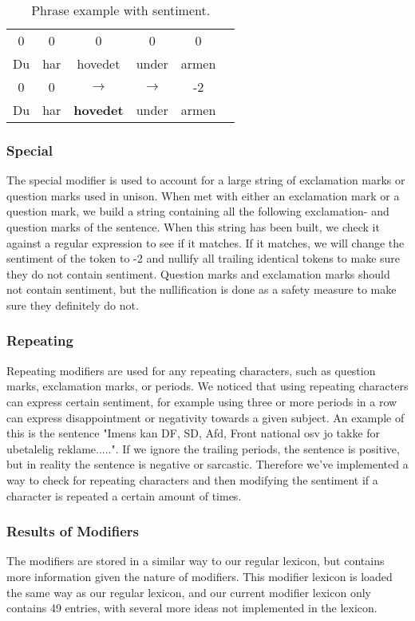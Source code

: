 \begin{table}[H]
	\begin{tabular}{cccccc} 
		0 & 0 & 0 & 0 & 0 & \\ 
		Du & har & hovedet & under & armen &  \\ 
		0 & 0 & $\rightarrow$ & $\rightarrow$ & -2 &  \\ 
		Du & har & \textbf{hovedet} & under & armen &   
	\end{tabular}
	\centering
	\caption{Phrase example with sentiment.}
	\label{phraseexample}
\end{table}


\subsubsection{Special}
The special modifier is used to account for a large string of exclamation marks or question marks used in unison. When met with either an exclamation mark or a question mark, we build a string containing all the following exclamation- and question marks of the sentence. When this string has been built, we check it against a regular expression to see if it matches. If it matches, we will change the sentiment of the token to -2 and nullify all trailing identical tokens to make sure they do not contain sentiment. Question marks and exclamation marks should not contain sentiment, but the nullification is done as a safety measure to make sure they definitely do not.

\subsubsection{Repeating}
Repeating modifiers are used for any repeating characters, such as question marks, exclamation marks, or periods. We noticed that using repeating characters can express certain sentiment, for example using three or more periods in a row can express disappointment or negativity towards a given subject. 
An example of this is the sentence "Imens kan DF, SD, Afd, Front national osv jo takke for ubetalelig reklame.....". If we ignore the trailing periods, the sentence is positive, but in reality the sentence is negative or sarcastic. 
Therefore we've implemented a way to check for repeating characters and then modifying the sentiment if a character is repeated a certain amount of times.

\subsubsection{Results of Modifiers}
The modifiers are stored in a similar way to our regular lexicon, but contains more information given the nature of modifiers. This modifier lexicon is loaded the same way as our regular lexicon, and our current modifier lexicon only contains 49 entries, with several more ideas not implemented in the lexicon.

